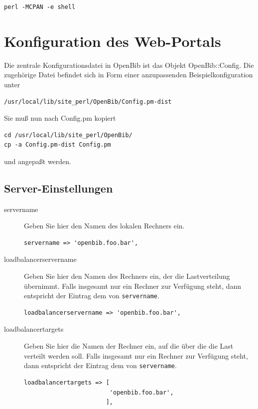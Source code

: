 \documentclass[11pt, twoside, a4paper, BCOR8mm, DIV12, bibtotoc,idxtotoc]{scrbook}
\begin{document}
\begin{verbatim}
perl -MCPAN -e shell
\end{verbatim}

\section{Konfiguration des Web-Portals}
\label{sec:confportal}

Die zentrale Konfigurationsdatei in OpenBib ist das Objekt
OpenBib::Config. Die zugehörige Datei befindet sich in Form einer
anzupassenden Beispielkonfiguration unter 

\begin{verbatim}
/usr/local/lib/site_perl/OpenBib/Config.pm-dist
\end{verbatim}

Sie muß nun nach Config.pm kopiert 

\begin{verbatim}
cd /usr/local/lib/site_perl/OpenBib/
cp -a Config.pm-dist Config.pm
\end{verbatim}

und angepaßt werden.


\subsection{Server-Einstellungen}

\begin{description}
\item[servername] Geben Sie hier den Namen des lokalen Rechners
  ein. 
\begin{verbatim}
servername => 'openbib.foo.bar',
\end{verbatim}

\item[loadbalancerservername] Geben Sie hier den Namen des Rechners
  ein, der die Lastverteilung übernimmt. Falls insgesamt nur ein
  Rechner zur Verfügung steht, dann entspricht der Eintrag dem von
  \texttt{servername}.
\begin{verbatim}
loadbalancerservername => 'openbib.foo.bar',
\end{verbatim}

\item[loadbalancertargets] Geben Sie hier die Namen der Rechner ein,
  auf die über die die Last verteilt werden soll. Falls insgesamt nur
  ein Rechner zur Verfügung steht, dann entspricht der Eintrag dem
  von \texttt{servername}.
\begin{verbatim}
loadbalancertargets => [
                        'openbib.foo.bar',
                       ],
\end{verbatim}
\end{description}
\end{document}
